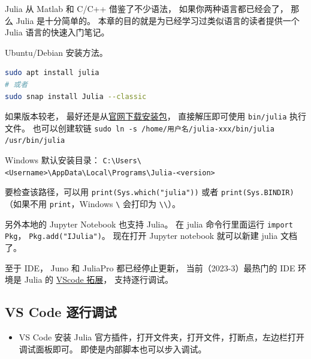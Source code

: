 
Julia 从 Matlab 和 C/C++ 借鉴了不少语法， 如果你两种语言都已经会了， 那么 Julia 是十分简单的。 本章的目的就是为已经学习过类似语言的读者提供一个 Julia 语言的快速入门笔记。

Ubuntu/Debian 安装方法。
\begin{lstlisting}[language=bash]
sudo apt install julia
# 或者
sudo snap install Julia --classic
\end{lstlisting}
如果版本较老， 最好还是从\href{https://julialang.org/downloads}{官网下载安装包}， 直接解压即可使用 \verb`bin/julia` 执行文件。 也可以创建软链 \verb`sudo ln -s /home/用户名/julia-xxx/bin/julia /usr/bin/julia`

Windows 默认安装目录： \verb`C:\Users\<Username>\AppData\Local\Programs\Julia-<version>`

要检查该路径，可以用 \verb`print(Sys.which("julia"))` 或者 \verb`print(Sys.BINDIR)`（如果不用 \verb`print`，Windows \verb`\` 会打印为 \verb`\\`）。

另外本地的 Jupyter Notebook 也支持 Julia。 在 julia 命令行里面运行 \verb`import Pkg`， \verb`Pkg.add("IJulia")`。 现在打开 Jupyter notebook 就可以新建 julia 文档了。

至于 IDE， Juno 和 JuliaPro 都已经停止更新， 当前（2023-3）最热门的 IDE 环境是 Julia 的 \href{https://www.julia-vscode.org}{VScode 拓展}， 支持逐行调试。

\subsection{VS Code 逐行调试}
\begin{itemize}
\item VS Code 安装 Julia 官方插件，打开文件夹，打开文件，打断点，左边栏打开调试面板即可。 即使是内部脚本也可以步入调试。
\end{itemize}

